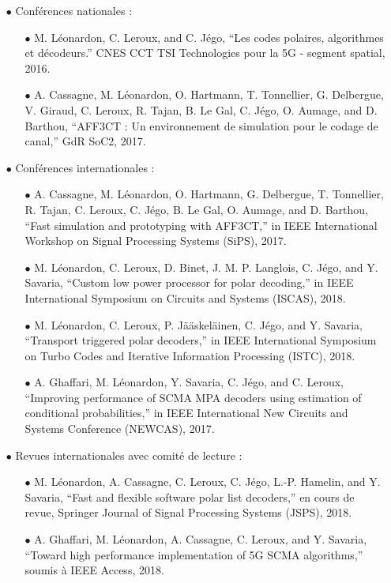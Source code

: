 \begin{itemize}
		\item[$\bullet$] Conférences nationales :
	\begin{itemize}
		\item[$\bullet$] M. Léonardon, C. Leroux, and C. Jégo, “Les codes polaires, algorithmes et décodeurs.”
		CNES CCT TSI Technologies pour la 5G - segment spatial, 2016.
     	\item[$\bullet$] A. Cassagne, M. Léonardon, O. Hartmann, T. Tonnellier, G. Delbergue, V. Giraud, C. Leroux, R. Tajan, B. Le Gal, C. Jégo, O. Aumage, and D. Barthou, “AFF3CT : Un environnement de simulation pour le codage de canal,” GdR SoC2, 2017.
	\end{itemize}
	\item[$\bullet$] Conférences internationales :
	\begin{itemize}
		\item[$\bullet$]  A. Cassagne, M. Léonardon, O. Hartmann, G. Delbergue, T. Tonnellier, R. Tajan, C. Leroux, C. Jégo, B. Le Gal, O. Aumage, and D. Barthou, “Fast simulation and prototyping with AFF3CT,” in IEEE International Workshop on Signal Processing Systems (SiPS), 2017.
		\item[$\bullet$] M. Léonardon, C. Leroux, D. Binet, J. M. P. Langlois, C. Jégo, and Y. Savaria, “Custom low power processor for polar decoding,” in IEEE International Symposium on Circuits and Systems (ISCAS), 2018.
		\item[$\bullet$] M. Léonardon, C. Leroux, P. Jääskeläinen, C. Jégo, and Y. Savaria, “Transport triggered polar decoders,” in IEEE International Symposium on Turbo Codes and Iterative Information Processing (ISTC), 2018.
		\item[$\bullet$] A. Ghaffari, M. Léonardon, Y. Savaria, C. Jégo, and C. Leroux, “Improving performance of SCMA MPA decoders using estimation of conditional probabilities,” in IEEE International New Circuits and Systems Conference (NEWCAS), 2017.
	\end{itemize}
	\item[$\bullet$] Revues internationales avec comité de lecture :
	\begin{itemize}
		\item[$\bullet$] M. Léonardon, A. Cassagne, C. Leroux, C. Jégo, L.-P. Hamelin, and Y. Savaria, “Fast
        and flexible software polar list decoders,” en cours de revue, Springer Journal of Signal Processing Systems
        (JSPS), 2018.
        \item[$\bullet$] A. Ghaffari, M. Léonardon, A. Cassagne, C. Leroux, and Y. Savaria, “Toward high performance implementation of 5G SCMA algorithms,” soumis à IEEE Access, 2018.
	\end{itemize}
\end{itemize}

